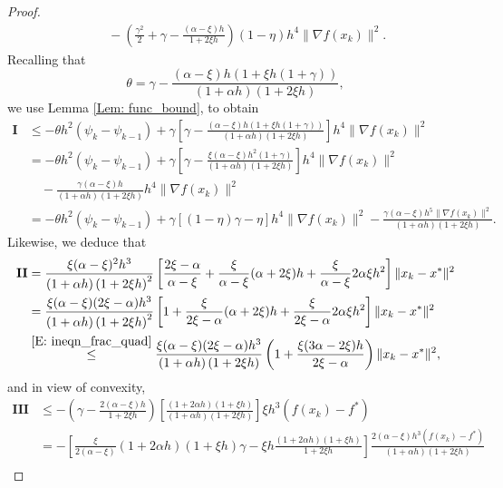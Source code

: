 \documentclass[pdflatex,sn-mathphys-num]{sn-jnl}
\theoremstyle{thmstyleone}
\theoremstyle{thmstyletwo}
\theoremstyle{thmstylethree}
\begin{document}
\begin{appendices}
\begin{proof}
\begin{align*}
&\quad -\left( \frac{\gamma^2}{2} + \gamma - \frac{(\alpha-\xi) h}{1+2\xi h} \right)(1-\eta) h^4 \| \nabla f(x_k) \|^2.
\end{align*}
Recalling that
$$ \theta = \gamma - \frac{(\alpha-\xi)h \left( 1 + \xi h (1+\gamma) \right) }{(1+\alpha h)( 1+2\xi h )}, $$
we use Lemma \ref{Lem: func_bound}, to obtain
\begin{align*}
\mathbf{I}
&\le -\theta h^2 (\psi_k-\psi_{k-1}) + \gamma \left[ \gamma - \frac{(\alpha-\xi)h \left( 1 + \xi h (1+\gamma) \right) }{(1+\alpha h)( 1+2\xi h )} \right] h^4 \| \nabla f(x_k) \|^2 \\
&= -\theta h^2 (\psi_k-\psi_{k-1}) 
   + \gamma \left[ \gamma - \frac{\xi(\alpha-\xi)h^2(1+\gamma)}{(1+\alpha h)( 1+2\xi h )} \right] h^4 \| \nabla f(x_k) \|^2 \\
&\quad - \frac{ \gamma(\alpha-\xi) h }{(1+\alpha h)( 1+2\xi h )}h^4 \| \nabla f(x_k) \|^2 \\
&= -\theta h^2 (\psi_k-\psi_{k-1}) 
   + \gamma\left[ (1-\eta)\gamma - \eta \right]h^4 \| \nabla f(x_k) \|^2 
   - \frac{ \gamma(\alpha-\xi) h^5 \| \nabla f(x_k) \|^2 }{(1+\alpha h) ( 1+2\xi h )}.
\end{align*} 
Likewise, we deduce that
\begin{align*}
\mathbf{II} 
&= \frac{\xi(\alpha-\xi)^2 h^3}{(1+\alpha h)\left(1+2\xi h\right)^2} \left[ \frac{2\xi-\alpha}{\alpha-\xi} + \frac{\xi}{\alpha-\xi}(\alpha+2\xi) h + \frac{\xi}{\alpha-\xi} 2\alpha\xi h^2 \right] \| x_k - x^* \|^2 \\
&= \frac{\xi(\alpha-\xi)(2\xi-\alpha) h^3}{(1+\alpha h)\left(1+2\xi h\right)^2}\left[ 1 + \frac{\xi}{2\xi-\alpha}(\alpha+2\xi) h + \frac{\xi}{2\xi-\alpha} 2\alpha\xi h^2  \right]\| x_k - x^* \|^2 \\ 
&\stackrel{\eqref{E: ineqn_frac_quad}}{\le} 
  \frac{\xi(\alpha-\xi)(2\xi-\alpha) h^3}{(1+\alpha h)\left(1+2\xi h\right)}\left( 1 + \frac{\xi(3\alpha-2\xi)h}{2\xi-\alpha} \right) \| x_k - x^* \|^2,
\end{align*}
and in view of convexity,
\begin{align*}
\mathbf{III}
&\le - \left(\gamma - \frac{2(\alpha-\xi) h}{1+2\xi h} \right) \left[ \frac{ (1+2\alpha h)( 1 + \xi h ) }{(1+\alpha h)( 1 + 2\xi h )} \right] \xi h^3 \left( f(x_k) - f^* \right) \\ 
&= - \left[ \frac{\xi}{2(\alpha-\xi)}(1+2\alpha h)(1+\xi h)\gamma - \xi h \frac{(1+2\alpha h)( 1 + \xi h )}{ 1 + 2\xi h } \right] \frac{ 2(\alpha-\xi) h^3 \left( f(x_k) - f^* \right) }{(1+\alpha h)(1+2\xi h)} \\

\end{align*}
\end{proof}
\end{appendices}
\end{document}
